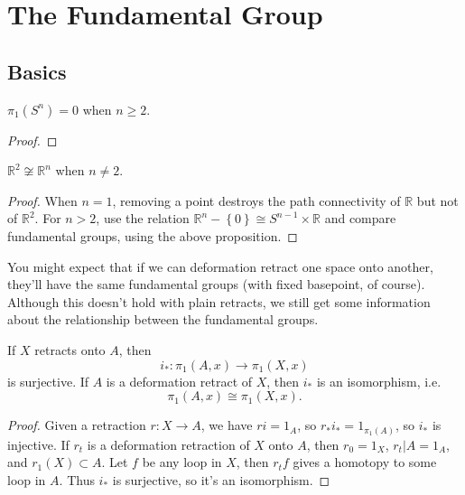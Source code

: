 \documentclass[twoside,10pt]{report}
\begin{document}
\tableofcontents


\chapter{The Fundamental Group}


\section{Basics}

\begin{prop}
        $\pi_1(S^{n}) = 0$ when $n \geq 2$.
\end{prop}
\begin{proof}
\end{proof}

\begin{cor}
        $\mathbb{R}^2 \not\cong \mathbb{R}^{n}$ when $n \neq 2$.
\end{cor}
\begin{proof}
	When $n=1$, removing a point destroys the path connectivity of $\mathbb{R}$ but not of $\mathbb{R}^2$. For $n > 2$, use the relation $\mathbb{R}^{n} - \left\{ 0 \right\} \cong S^{n-1} \times \mathbb{R}$ and compare fundamental groups, using the above proposition.
\end{proof}

You might expect that if we can deformation retract one space onto another, they'll have the same fundamental groups (with fixed basepoint, of course). Although this doesn't hold with plain retracts, we still get some information about the relationship between the fundamental groups.

\begin{prop}
If $X$ retracts onto $A$, then
\[
	i_{*}: \pi_1(A,x) \to \pi_1(X,x)
\] is surjective. If $A$ is a deformation retract of $X$, then $i_{*}$ is an isomorphism, i.e.
\[
	\pi_1(A,x) \cong \pi_1(X,x).
\] 
\end{prop}
\begin{proof}
	Given a retraction $r:X\to A$, we have $ri=1_{A}$, so $r_{*}i_{*} = 1_{\pi_1(A)}$, so $i_{*}$ is injective. If $r_{t}$ is a deformation retraction of $X$ onto $A$, then $r_0=1_{X}$, $r_{t}|A = 1_{A}$, and $r_1(X) \subset A$. Let $f$ be any loop in $X$, then $r_t f$ gives a homotopy to some loop in $A$. Thus $i_{*}$ is surjective, so it's an isomorphism.
\end{proof}
\end{document}
